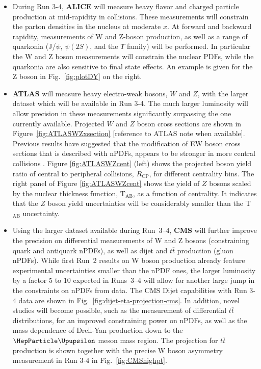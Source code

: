 \documentclass[../report.tex]{subfiles}
\begin{document}
\begin{itemize}
\item During Run 3-4, \textbf{ALICE} will measure heavy flavor and charged particle production at mid-rapidity in \pPb collisions. These measurements will constrain the parton densities in the nucleus at moderate $x$. At forward and backward rapidity, measurements of W and Z-boson production, as well as a range of quarkonia (J/$\psi$, $\psi(2S)$, and the $\Upsilon$ family) will be performed. In particular the W and Z boson measurements will constrain the nuclear PDFs, while the quarkonia are also sensitive to final state effects. An example is given for the Z boson in Fig.~\ref{fig:plotDY} on the right. 
\item \textbf{ATLAS} will measure heavy electro-weak bosons, $W$ and $Z$, with the larger \pPb dataset which will be available in Run 3-4.  The much larger luminosity will allow precision in these measurements significantly surpassing the one currently available.  Projected $W$ and $Z$ boson cross sections are shown in Figure~\ref{fig:ATLASWZxsection} [reference to ATLAS note when available].  Previous results have suggested that the modification of EW boson cross sections that is described with nPDFs, appears to be stronger in more central collisions \cite{Aad:2015gta,TheATLAScollaboration:2015lnm}.  Figure \ref{fig:ATLASWZcent} (left) shows the projected boson yield ratio of central to peripheral collisions, $R_{\mathrm{CP}}$, for different centrality bins.  The right panel of Figure \ref{fig:ATLASWZcent} shows the yield of $Z$ bosons scaled by the nuclear thickness function, T$_{\mathrm{AB}}$,  as a function of centrality. It indicates that the $Z$ boson yield uncertainties will be considerably smaller than the T$_{\mathrm{AB}}$ uncertainty. 
\item  Using the larger \pPb dataset available during Run~3--4, \textbf{CMS} will further improve the precision on differential measurements of W and Z bosons (constraining quark and antiquark nPDFs), as well as dijet and $t\overline{t}$ production (gluon nPDFs). While first Run~2 results on W boson production already feature experimental uncertainties smaller than the nPDF ones, the larger luminosity by a factor 5 to 10 expected in Runs~3--4 will allow for another large jump in the constraints on nPDFs from data. The CMS Dijet capabilities with Run 3-4 data are shown in Fig.~\ref{fig:dijet-eta-projection-cms}. In addition, novel studies will become possible, such as the measurement of differential $t\overline{t}$ distributions, for an improved constraining power on nPDFs, as well as the mass dependence of Drell-Yan production down to the $\PGU$ meson mass region. The projection for $t\overline{t}$ production is shown together with the precise W boson asymmetry measurement in Run 3-4 in Fig.~\ref{fig:CMShighpt}.

\end{itemize}
\end{document}
